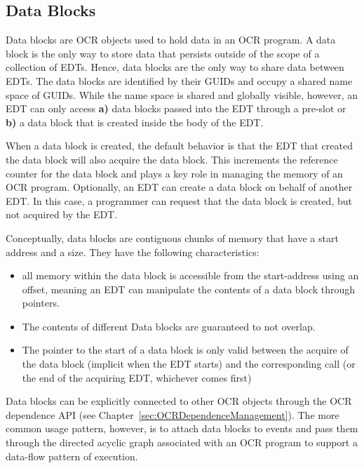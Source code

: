 \subsection{Data Blocks}
\label{sec:datablocks}
Data blocks are OCR objects used to hold data in an OCR program. A
data block is the only way to store data that persists outside of the
scope of a collection of EDTs. Hence, data blocks are the only way to
share data between EDTs. The data blocks are identified by their
GUIDs and occupy a shared name space of GUIDs. While the name space
is shared and globally visible, however, an EDT can only access {\bf a)}
data blocks passed into the EDT through a pre-slot or {\bf b)} a data block
that is created inside the body of the EDT.

When a data block is created, the default behavior is that the EDT
that created the data block will also acquire the data block. This
increments the reference counter for the data block and plays a key
role in managing the memory of an OCR program. Optionally, an EDT can
create a data block on behalf of another EDT. In this case, a
programmer can request that the data block is created, but not
acquired by the EDT.

Conceptually, data blocks are contiguous chunks of memory
that have a start address and a size. They have the following characteristics:
\begin{itemize}
\item all memory within the data block is accessible from the
start-address using an offset, meaning an EDT can manipulate the
contents of a data block through pointers.
\item The contents of different Data blocks are guaranteed to not
overlap.
\item The pointer to the start of a data block is only valid between
the acquire of the data block (implicit when the EDT starts) and the
corresponding  call (or the end of the acquiring
EDT, whichever comes first)
\end{itemize}

Data blocks can be explicitly connected to other OCR objects through the OCR
dependence API (see Chapter~\ref{sec:OCRDependenceManagement}).
The more common usage pattern, however, is
to attach data blocks to events and pass them through the
directed acyclic graph associated with an OCR program to support a
data-flow pattern of execution.

